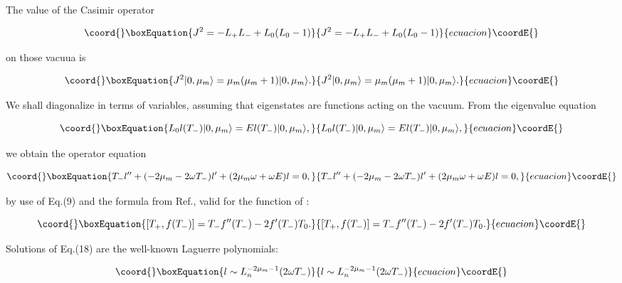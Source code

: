 \documentclass[a4paper,preprint,aps]{revtex4}
\begin{document}
The value of the Casimir operator


\begin{equation}\coord{}\boxEquation{
	J^{2}=-L_{+}L_{-}+L_{0}(L_{0}-1)
}{
	J^{2}=-L_{+}L_{-}+L_{0}(L_{0}-1)
}{ecuacion}\coordE{}\end{equation}

on those vacuua is


\begin{equation}\coord{}\boxEquation{
	J^{2}|0,\mu_{m}\rangle = \mu_{m}(\mu_{m}+1)|0,\mu_{m}\rangle .
}{
	J^{2}|0,\mu_{m}\rangle = \mu_{m}(\mu_{m}+1)|0,\mu_{m}\rangle .
}{ecuacion}\coordE{}\end{equation}

We shall diagonalize \coordHE{} in terms of \coordHE{} variables, assuming that
 eigenstates are functions \coordHE{} acting on the vacuum.
From the eigenvalue equation

    
\begin{equation}\coord{}\boxEquation{
	L_{0}l(T_{-})|0,\mu_{m}\rangle = El(T_{-})|0,\mu_{m}\rangle ,
}{
	L_{0}l(T_{-})|0,\mu_{m}\rangle = El(T_{-})|0,\mu_{m}\rangle ,
}{ecuacion}\coordE{}\end{equation}

we obtain the operator equation

\begin{equation}\coord{}\boxEquation{
	T_{-}l^{\prime \prime}+(-2\mu_{m}-2\omega T_{-})l^{\prime}+
	(2\mu_{m}\omega + \omega E)l=0,
}{
	T_{-}l^{\prime \prime}+(-2\mu_{m}-2\omega T_{-})l^{\prime}+
	(2\mu_{m}\omega + \omega E)l=0,
}{ecuacion}\coordE{}\end{equation}

by use of Eq.(9) and the formula from Ref.\cite{AJ}, valid for the function of
 \coordHE{}:


\begin{equation}\coord{}\boxEquation{
	[T_{+},f(T_{-})]=T_{-}f^{\prime \prime} (T_{-})-2f^{\prime}(T_{-})
	T_{0}.
}{
	[T_{+},f(T_{-})]=T_{-}f^{\prime \prime} (T_{-})-2f^{\prime}(T_{-})
	T_{0}.
}{ecuacion}\coordE{}\end{equation}


Solutions of Eq.(18) are the well-known Laguerre polynomials:


\begin{equation}\coord{}\boxEquation{
	l\sim L_{n}^{-2\mu_{m}-1}(2\omega T_{-})
}{
	l\sim L_{n}^{-2\mu_{m}-1}(2\omega T_{-})
}{ecuacion}\coordE{}\end{equation}
\end{document}
